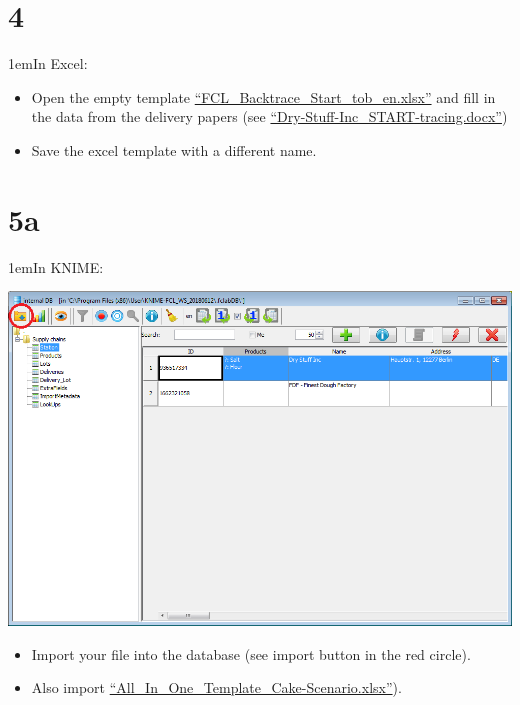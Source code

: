 \documentclass[10pt]{beamer}
\begin{document}
\section{4}
\begin{frame}
\leftskip1em{In Excel:}
	\begin{itemize}
		\item Open the empty template \href{https://foodrisklabs.bfr.bund.de/wp-content/uploads/2015/11/FCL_Backtrace_Start_tob_en.xlsx}{``FCL\_Backtrace\_Start\_tob\_en.xlsx''} and fill in the data from the delivery papers (see \href{https://github.com/SiLeBAT/BfROpenLabResources/raw/master/GitHubPages/documents/foodchainlab_datacollectimport/Dry-Stuff-Inc_START-tracing.docx}{``Dry-Stuff-Inc\_START-tracing.docx''})
		\item Save the excel template with a different name.
	\end{itemize}
\end{frame}

\section{5a}
\begin{frame}
\leftskip1em{In KNIME:}
	\begin{center}
			\includegraphics[height=0.6\textheight]{5a.png}
	\end{center}
	\begin{itemize}
		\item Import your file into the database (see import button in the red circle).
		\item Also import \href{https://github.com/SiLeBAT/BfROpenLabResources/raw/master/GitHubPages/documents/foodchainlab_datacollectimport/All_In_One_Template_Cake-Scenario.xlsx}{``All\_In\_One\_Template\_Cake-Scenario.xlsx''}).
	\end{itemize}
\end{frame}
\end{document}

